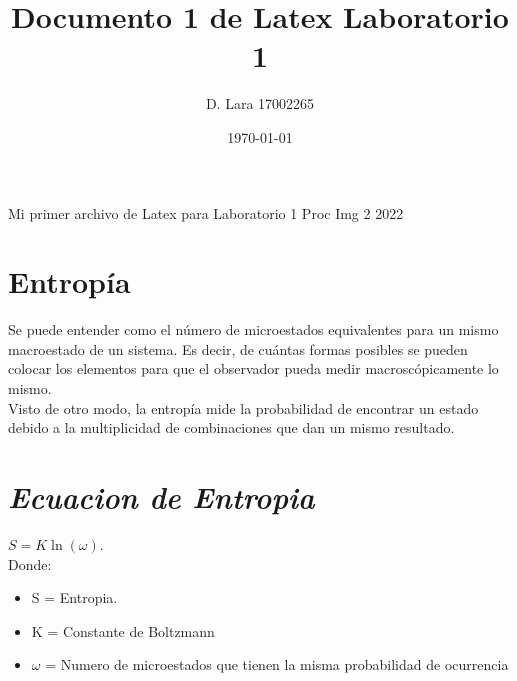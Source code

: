 \documentclass{article}[12pt, letterpaper]
\title{Documento 1 de Latex Laboratorio 1}
\author{D. Lara 17002265}
\date{\today}
\begin{document}
	\maketitle
	Mi primer archivo de Latex para Laboratorio 1 Proc Img 2 2022
	
	\section{Entropía} 

	Se puede entender como el número de microestados equivalentes para un mismo macroestado de un sistema. Es decir, de cuántas formas posibles se pueden colocar los elementos para que el observador pueda medir macroscópicamente lo mismo.\\ %
	
	Visto de otro modo, la entropía mide la probabilidad de encontrar un estado debido a la multiplicidad de combinaciones que dan un mismo resultado.
	
	\section{\textit{Ecuacion de Entropia }}
	$S = K\ln(\omega)$.	\\ %
	
	Donde:
	\begin{itemize} 
		\item S = Entropia.
		\item K = Constante de Boltzmann
		\item $\omega$ = Numero de microestados que tienen la misma probabilidad de ocurrencia
		
		
	\end{itemize}
	
	
	
\end{document}
